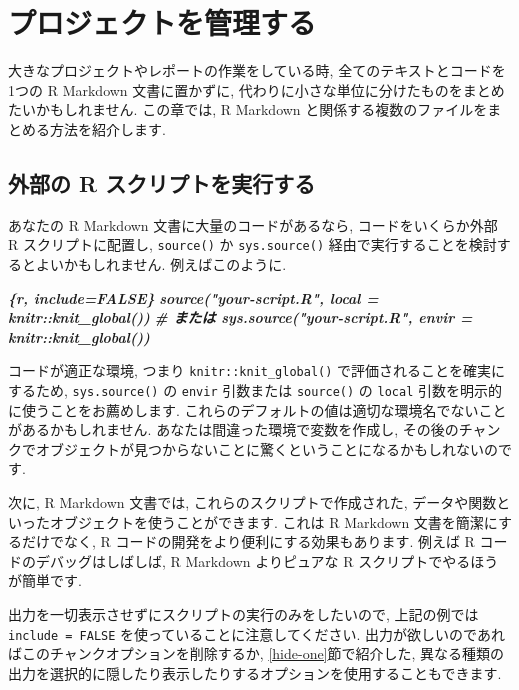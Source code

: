 \documentclass[
  11pt,
]{bxjsreport}
\newenvironment{Shaded}{\begin{snugshade}}{\end{snugshade}}
\newcommand{\InformationTok}[1]{\textcolor[rgb]{0.56,0.35,0.01}{\textbf{\textit{#1}}}}
\begin{document}
\hypertarget{managing-projects}{%
\chapter{プロジェクトを管理する}\label{managing-projects}}

大きなプロジェクトやレポートの作業をしている時, 全てのテキストとコードを1つの R Markdown 文書に置かずに, 代わりに小さな単位に分けたものをまとめたいかもしれません. この章では, R Markdown と関係する複数のファイルをまとめる方法を紹介します.

\hypertarget{source-script}{%
\section{外部の R スクリプトを実行する}\label{source-script}}

あなたの R Markdown 文書に大量のコードがあるなら, コードをいくらか外部 R スクリプトに配置し, \texttt{source()} か \texttt{sys.source()} 経由で実行することを検討するとよいかもしれません. 例えばこのように.

\begin{Shaded}
\begin{Highlighting}[]
\InformationTok{\textasciigrave{}\textasciigrave{}\textasciigrave{}\{r, include=FALSE\}}
\InformationTok{source("your{-}script.R", local = knitr::knit\_global())}
\InformationTok{\# または sys.source("your{-}script.R", envir = knitr::knit\_global())}
\InformationTok{\textasciigrave{}\textasciigrave{}\textasciigrave{}}
\end{Highlighting}
\end{Shaded}

コードが適正な環境, つまり \texttt{knitr::knit\_global()} で評価されることを確実にするため, \texttt{sys.source()} の \texttt{envir} 引数または \texttt{source()} の \texttt{local} 引数を明示的に使うことをお薦めします. これらのデフォルトの値は適切な環境名でないことがあるかもしれません. あなたは間違った環境で変数を作成し, その後のチャンクでオブジェクトが見つからないことに驚くということになるかもしれないのです.

次に, R Markdown 文書では, これらのスクリプトで作成された, データや関数といったオブジェクトを使うことができます. これは R Markdown 文書を簡潔にするだけでなく, R コードの開発をより便利にする効果もあります. 例えば R コードのデバッグはしばしば, R Markdown よりピュアな R スクリプトでやるほうが簡単です.

出力を一切表示させずにスクリプトの実行のみをしたいので, 上記の例では \texttt{include = FALSE} を使っていることに注意してください. 出力が欲しいのであればこのチャンクオプションを削除するか, \ref{hide-one}節で紹介した, 異なる種類の出力を選択的に隠したり表示したりするオプションを使用することもできます.
\end{document}
